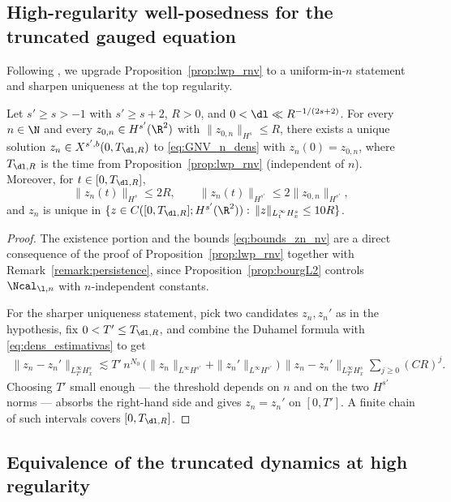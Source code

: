 \subsection{High-regularity well-posedness for the truncated gauged equation}

Following \cite[Lemma~5.4]{chcora}, we upgrade
Proposition~\ref{prop:lwp_rnv} to a uniform-in-$n$ statement and
sharpen uniqueness at the top regularity.

\begin{lemma}\label{lem:zn_nv}
Let $s'\ge s>-1$ with $s'\ge s+2$, $R>0$, and
$0<\dl\ll R^{-1/(2s+2)}$. For every $n\in\N$ and every
$z_{0,n}\in H^{s'}(\R^2)$ with $\|z_{0,n}\|_{H^s}\le R$, there exists
a unique solution $z_n\in X^{s',b}(0,T_{\dl,R})$ to
\eqref{eq:GNV_n_dens} with $z_n(0)=z_{0,n}$, where $T_{\dl,R}$ is
the time from Proposition~\ref{prop:lwp_rnv} (independent of $n$).
Moreover, for $t\in[0,T_{\dl,R}]$,
\begin{equation}\label{eq:bounds_zn_nv}
\|z_n(t)\|_{H^s}\le 2R,
\qquad
\|z_n(t)\|_{H^{s'}}\le 2\|z_{0,n}\|_{H^{s'}},
\end{equation}
and $z_n$ is unique in
$\{z\in C([0,T_{\dl,R}]; H^{s'}(\R^2)):\,
\|z\|_{L^\infty_t H^s_x}\le 10R\}$.
\end{lemma}

\begin{proof}
The existence portion and the bounds \eqref{eq:bounds_zn_nv} are a
direct consequence of the proof of Proposition~\ref{prop:lwp_rnv}
together with Remark~\ref{remark:persistence}, since
Proposition~\ref{prop:bourgL2} controls $\Ncal_{\l,n}$ with
$n$-independent constants.

For the sharper uniqueness statement, pick two candidates
$z_n,z_n'$ as in the hypothesis, fix $0<T'\le T_{\dl,R}$, and
combine the Duhamel formula with
\eqref{eq:dens_estimativas} to get
\begin{align*}
\|z_n-z_n'\|_{L^\infty_{T'}H^s_x}
\lesssim T'\, n^{N_0}\,
\big(\|z_n\|_{L^\infty H^{s'}}+\|z_n'\|_{L^\infty H^{s'}}\big)
\,\|z_n-z_n'\|_{L^\infty_{T'}H^s_x}
\sum_{j\ge 0}(CR)^j.
\end{align*}
Choosing $T'$ small enough --- the threshold depends on $n$ and on
the two $H^{s'}$ norms --- absorbs the right-hand side and gives
$z_n=z_n'$ on $[0,T']$. A finite chain of such intervals covers
$[0,T_{\dl,R}]$.
\end{proof}

\subsection{Equivalence of the truncated dynamics at high regularity}

